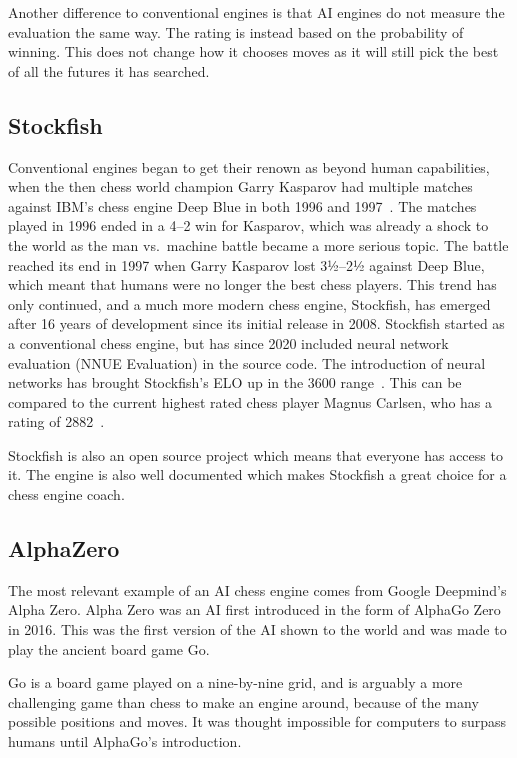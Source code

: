 Another difference to conventional engines is that AI engines do not measure the evaluation the same way.
The rating is instead based on the probability of winning.
This does not change how it chooses moves as it will still pick the best of all the futures it has searched.

\subsection{Stockfish}\label{subsec:stockfish}

Conventional engines began to get their renown as beyond human capabilities, when the then chess world champion
Garry Kasparov had multiple matches against IBM's chess engine Deep Blue in both 1996 and
1997~\cite{Garry-Kasparov-vs-Deep-Blue}.
The matches played in 1996 ended in a 4--2 win for Kasparov, which was already a shock to the world as the man vs.\
machine battle became a more serious topic.
The battle reached its end in 1997 when Garry Kasparov lost 3½--2½ against Deep Blue, which meant that humans
were no longer the best chess players.
This trend has only continued, and a much more modern chess engine, Stockfish, has emerged after 16 years of development
since its initial release in 2008.
Stockfish started as a conventional chess engine, but has since 2020 included neural network
evaluation (NNUE Evaluation) in the source code.
The introduction of neural networks has brought Stockfish's ELO up in the 3600 range~\cite{Stockfish}.
This can be compared to the current highest rated chess player Magnus Carlsen, who has a
rating of 2882~\cite{highest-ELO-chess-player}.

Stockfish is also an open source project which means that everyone has access to it.
The engine is also well documented which makes Stockfish a great choice for a chess engine coach.

\subsection{AlphaZero}\label{subsec:alphazero}

The most relevant example of an AI chess engine comes from Google Deepmind's Alpha Zero.
Alpha Zero was an AI first introduced in the form of AlphaGo Zero in 2016.
This was the first version of the AI shown to the world and was made to play the ancient board game Go.

Go is a board game played on a nine-by-nine grid, and is arguably a more challenging game than chess to make an engine
around, because of the many possible positions and moves.
It was thought impossible for computers to surpass humans until AlphaGo's introduction.

